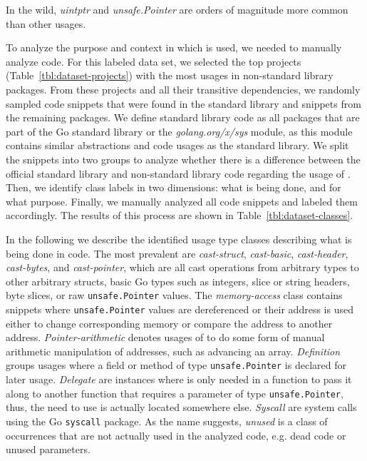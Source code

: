 \begin{tcolorbox}[boxsep=1pt, enlarge top by=5pt, title=Answer to \ref{rq:distTypes}]
In the wild, \textit{uintptr} and \textit{unsafe.Pointer} are orders of magnitude more common than other \unsafe{} usages.
\end{tcolorbox}



To analyze the purpose and context in which \unsafe{} is used, we needed to manually analyze code.
For this labeled data set, we selected the top  projects (Table~\ref{tbl:dataset-projects}) with the most \unsafe{} usages in non-standard library packages.
From these projects and all their transitive dependencies, we randomly sampled  code snippets that were found in the standard library and  snippets from the remaining packages.
We define standard library code as all packages that are part of the Go standard library or the \textit{golang.org/x/sys} module, as this module contains similar abstractions and code usages as the standard library.
We split the snippets into two groups to analyze whether there is a difference between the official standard library and non-standard library code regarding the usage of \unsafe{}.
Then, we identify class labels in two dimensions: what is being done, and for what purpose. 
Finally, we manually analyzed all  code snippets and labeled them accordingly.
The results of this process are shown in Table~\ref{tbl:dataset-classes}.




In the following we describe the identified usage type classes describing what is being done in code.
The most prevalent are \textit{cast-struct}, \textit{cast-basic}, \textit{cast-header}, \textit{cast-bytes}, and \textit{cast-pointer}, which are all cast operations from arbitrary types to other arbitrary structs, basic Go types such as integers, slice or string headers, byte slices, or raw \texttt{unsafe.Pointer} values.
The \textit{memory-access} class contains snippets where \texttt{unsafe.Pointer} values are dereferenced or their address is used either to change corresponding memory or compare the address to another address.
\textit{Pointer-arithmetic} denotes usages of \unsafe{} to do some form of manual arithmetic manipulation of addresses, such as advancing an array.
\textit{Definition} groups usages where a field or method of type \texttt{unsafe.Pointer} is declared for later usage.
\textit{Delegate} are instances where \unsafe{} is only needed in a function to pass it along to another function that requires a parameter of type \texttt{unsafe.Pointer}, thus, the need to use \unsafe{} is actually located somewhere else.
\textit{Syscall} are system calls using the Go \texttt{syscall} package.
As the name suggests, \textit{unused} is a class of occurrences that are not actually used in the analyzed code, e.g. dead code or unused parameters.

